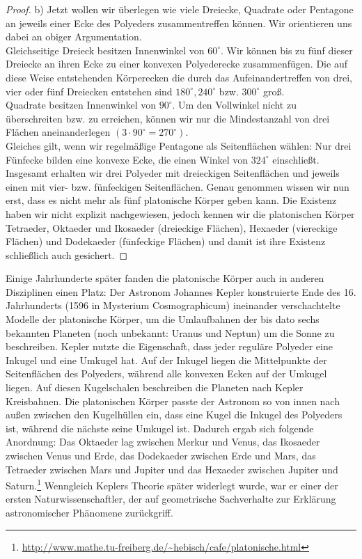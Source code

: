 \begin{proof}
b) Jetzt wollen wir überlegen wie viele Dreiecke, Quadrate oder Pentagone an jeweils einer Ecke des Polyeders zusammentreffen können. Wir orientieren uns dabei an obiger Argumentation.\\
Gleichseitige Dreieck besitzen Innenwinkel von $60^\circ$. Wir können bis zu fünf dieser Dreiecke an ihren Ecke zu einer konvexen Polyederecke zusammenfügen. Die auf diese Weise entstehenden Körperecken die durch das Aufeinandertreffen von drei, vier oder fünf Dreiecken entstehen sind  $180^\circ, 240^\circ$ bzw. $300^\circ$ groß.\\
Quadrate besitzen Innenwinkel von $90^\circ$. Um den Vollwinkel nicht zu überschreiten bzw. zu erreichen, können wir nur die Mindestanzahl von drei Flächen aneinanderlegen $(3\cdot90^\circ=270^\circ)$.\\
Gleiches gilt, wenn wir regelmäßige Pentagone als Seitenflächen wählen: Nur drei Fünfecke bilden eine konvexe Ecke, die einen Winkel von $324^\circ$ einschließt.\\
Insgesamt erhalten wir drei Polyeder mit dreieckigen Seitenflächen und jeweils einen mit vier- bzw. fünfeckigen Seitenflächen. Genau genommen wissen wir nun erst, dass es nicht mehr als fünf platonische Körper geben kann. Die Existenz haben wir nicht explizit nachgewiesen, jedoch kennen wir die platonischen Körper Tetraeder, Oktaeder und  Ikosaeder (dreieckige Flächen), Hexaeder (viereckige Flächen) und Dodekaeder (fünfeckige Flächen) und damit ist ihre Existenz schließlich auch gesichert. 
\end{proof}
Einige Jahrhunderte später fanden die platonische Körper auch in anderen Disziplinen einen Platz: 
Der Astronom Johannes Kepler konstruierte Ende des 16. Jahrhunderts (1596 in Mysterium Cosmographicum) ineinander verschachtelte Modelle der platonische Körper, um die Umlaufbahnen der bis dato sechs bekannten Planeten (noch unbekannt: Uranus und Neptun) um die Sonne zu beschreiben. Kepler nutzte die Eigenschaft, dass jeder reguläre Polyeder eine Inkugel und eine Umkugel hat. Auf der Inkugel liegen die Mittelpunkte der Seitenflächen des Polyeders, während alle konvexen Ecken auf der Umkugel liegen. Auf diesen Kugelschalen beschreiben die Planeten nach Kepler Kreisbahnen. Die platonischen Körper passte der Astronom so von innen nach außen zwischen den Kugelhüllen ein, dass eine Kugel die Inkugel des Polyeders ist, während die nächste seine Umkugel ist. Dadurch ergab sich folgende Anordnung: Das Oktaeder lag zwischen Merkur und Venus, das Ikosaeder zwischen Venus und Erde, das Dodekaeder zwischen Erde und Mars, das Tetraeder zwischen Mars und Jupiter und das Hexaeder zwischen Jupiter und Saturn.\footnote{\url{http://www.mathe.tu-freiberg.de/~hebisch/cafe/platonische.html}}  Wenngleich Keplers Theorie später widerlegt wurde, war er einer der ersten Naturwissenschaftler, der auf geometrische Sachverhalte zur Erklärung astronomischer Phänomene zurückgriff.\\
